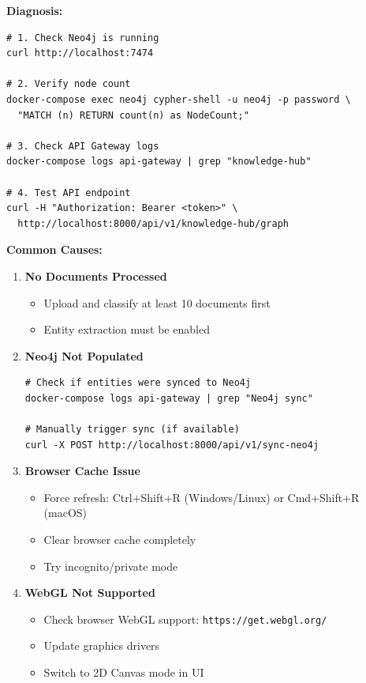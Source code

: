 \textbf{Diagnosis:}
\begin{commandbox}
\begin{lstlisting}[style=bashstyle]
# 1. Check Neo4j is running
curl http://localhost:7474

# 2. Verify node count
docker-compose exec neo4j cypher-shell -u neo4j -p password \
  "MATCH (n) RETURN count(n) as NodeCount;"

# 3. Check API Gateway logs
docker-compose logs api-gateway | grep "knowledge-hub"

# 4. Test API endpoint
curl -H "Authorization: Bearer <token>" \
  http://localhost:8000/api/v1/knowledge-hub/graph
\end{lstlisting}
\end{commandbox}

\textbf{Common Causes:}

\begin{enumerate}
    \item \textbf{No Documents Processed}
    \begin{itemize}
        \item Upload and classify at least 10 documents first
        \item Entity extraction must be enabled
    \end{itemize}

    \item \textbf{Neo4j Not Populated}
    \begin{lstlisting}[style=bashstyle]
# Check if entities were synced to Neo4j
docker-compose logs api-gateway | grep "Neo4j sync"

# Manually trigger sync (if available)
curl -X POST http://localhost:8000/api/v1/sync-neo4j
\end{lstlisting}

    \item \textbf{Browser Cache Issue}
    \begin{itemize}
        \item Force refresh: Ctrl+Shift+R (Windows/Linux) or Cmd+Shift+R (macOS)
        \item Clear browser cache completely
        \item Try incognito/private mode
    \end{itemize}

    \item \textbf{WebGL Not Supported}
    \begin{itemize}
        \item Check browser WebGL support: \texttt{https://get.webgl.org/}
        \item Update graphics drivers
        \item Switch to 2D Canvas mode in UI
    \end{itemize}
\end{enumerate}

